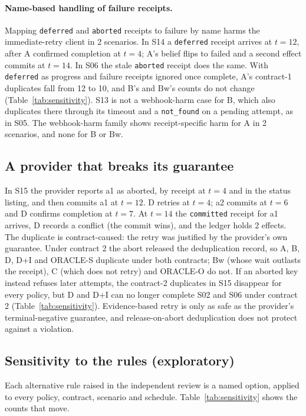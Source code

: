 \documentclass[11pt]{article}
\newcommand{\code}[1]{\texttt{#1}}
\begin{document}
\paragraph{Name-based handling of failure receipts.} Mapping \code{deferred} and \code{aborted} receipts to failure by name harms the immediate-retry client in 2 scenarios. In S14 a \code{deferred} receipt arrives at $t=12$, after A confirmed completion at $t=4$; A's belief flips to failed and a second effect commits at $t=14$. In S06 the stale \code{aborted} receipt does the same. With \code{deferred} as progress and failure receipts ignored once complete, A's contract-1 duplicates fall from 12 to 10, and B's and Bw's counts do not change (Table~\ref{tab:sensitivity}). S13 is not a webhook-harm case for B, which also duplicates there through its timeout and a \code{not\_found} on a pending attempt, as in S05. The webhook-harm family shows receipt-specific harm for A in 2 scenarios, and none for B or Bw.

\subsection{A provider that breaks its guarantee}\label{sec:s15}

In S15 the provider reports a1 as aborted, by receipt at $t=4$ and in the status listing, and then commits a1 at $t=12$. D retries at $t=4$; a2 commits at $t=6$ and D confirms completion at $t=7$. At $t=14$ the \code{committed} receipt for a1 arrives, D records a conflict (the commit wins), and the ledger holds 2 effects. The duplicate is contract-caused: the retry was justified by the provider's own guarantee. Under contract 2 the abort released the deduplication record, so A, B, D, D+I and ORACLE-S duplicate under both contracts; Bw (whose wait outlasts the receipt), C (which does not retry) and ORACLE-O do not. If an aborted key instead refuses later attempts, the contract-2 duplicates in S15 disappear for every policy, but D and D+I can no longer complete S02 and S06 under contract 2 (Table~\ref{tab:sensitivity}). Evidence-based retry is only as safe as the provider's terminal-negative guarantee, and release-on-abort deduplication does not protect against a violation.

\subsection{Sensitivity to the rules (exploratory)}\label{sec:sensitivity}

Each alternative rule raised in the independent review is a named option, applied to every policy, contract, scenario and schedule. Table~\ref{tab:sensitivity} shows the counts that move.
\end{document}
